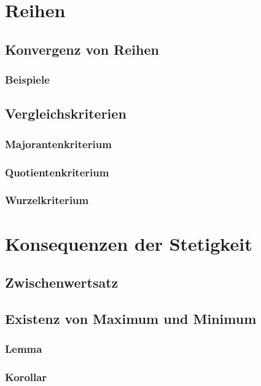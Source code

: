 \documentclass[10pt,a4paper^, twocolumn]{article}
\begin{document}
\section{Reihen}
\subsection{Konvergenz von Reihen}
\subsubsection{Beispiele}
\subsection{Vergleichskriterien}
\subsubsection{Majorantenkriterium}
\subsubsection{Quotientenkriterium}
\subsubsection{Wurzelkriterium}

\section{Konsequenzen der Stetigkeit}
\subsection{Zwischenwertsatz} 
\subsection{Existenz von Maximum und Minimum}
\subsubsection{Lemma}
\subsubsection{Korollar}
\end{document}
